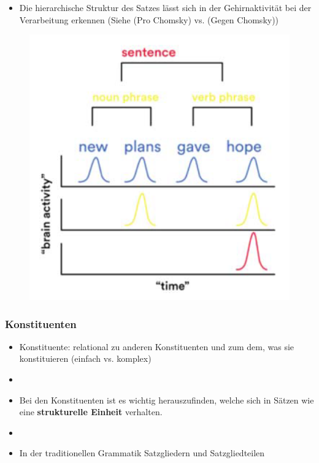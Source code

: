\begin{frame}

\begin{itemize}
	\item Die hierarchische Struktur des Satzes lässt sich in der Gehirnaktivität bei der Verarbeitung erkennen (Siehe \citet{Devitt15a} (Pro Chomsky) vs. \citet{Boutonnet15a} (Gegen Chomsky))	
\end{itemize}

\begin{figure}
\centering
	\includegraphics[scale=.33]{material/10gehirnaktivitaet}
	\caption{\citep[Quelle:][]{Boutonnet15a}}
\end{figure}

\end{frame}


\begin{frame}
\frametitle{Konstituenten}

\begin{itemize}
	\item Konstituente: relational zu anderen Konstituenten und zum dem, was sie konstituieren (\ras einfach vs. komplex)
	\item[]
	\item Bei den Konstituenten ist es wichtig herauszufinden, welche sich in Sätzen wie eine \textbf{strukturelle Einheit} verhalten.
	\item[]
	\item In der traditionellen Grammatik \ras Satzgliedern und Satzgliedteilen

\end{itemize}

\end{frame}


